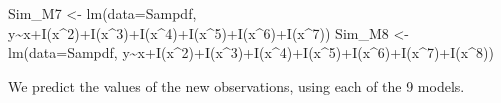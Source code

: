 \documentclass[
  letterpaper,
  DIV=11,
  numbers=noendperiod]{scrreprt}
\newenvironment{Shaded}{\begin{snugshade}}{\end{snugshade}}
\newcommand{\AttributeTok}[1]{\textcolor[rgb]{0.40,0.45,0.13}{#1}}
\newcommand{\DecValTok}[1]{\textcolor[rgb]{0.68,0.00,0.00}{#1}}
\newcommand{\FunctionTok}[1]{\textcolor[rgb]{0.28,0.35,0.67}{#1}}
\newcommand{\NormalTok}[1]{\textcolor[rgb]{0.00,0.23,0.31}{#1}}
\newcommand{\OtherTok}[1]{\textcolor[rgb]{0.00,0.23,0.31}{#1}}
\newcommand{\SpecialCharTok}[1]{\textcolor[rgb]{0.37,0.37,0.37}{#1}}
\begin{document}
\begin{Shaded}
\begin{Highlighting}[]
\NormalTok{Sim\_M7 }\OtherTok{\textless{}{-}} \FunctionTok{lm}\NormalTok{(}\AttributeTok{data=}\NormalTok{Sampdf, y}\SpecialCharTok{\textasciitilde{}}\NormalTok{x}\SpecialCharTok{+}\FunctionTok{I}\NormalTok{(x}\SpecialCharTok{\^{}}\DecValTok{2}\NormalTok{)}\SpecialCharTok{+}\FunctionTok{I}\NormalTok{(x}\SpecialCharTok{\^{}}\DecValTok{3}\NormalTok{)}\SpecialCharTok{+}\FunctionTok{I}\NormalTok{(x}\SpecialCharTok{\^{}}\DecValTok{4}\NormalTok{)}\SpecialCharTok{+}\FunctionTok{I}\NormalTok{(x}\SpecialCharTok{\^{}}\DecValTok{5}\NormalTok{)}\SpecialCharTok{+}\FunctionTok{I}\NormalTok{(x}\SpecialCharTok{\^{}}\DecValTok{6}\NormalTok{)}\SpecialCharTok{+}\FunctionTok{I}\NormalTok{(x}\SpecialCharTok{\^{}}\DecValTok{7}\NormalTok{))}
\NormalTok{Sim\_M8 }\OtherTok{\textless{}{-}} \FunctionTok{lm}\NormalTok{(}\AttributeTok{data=}\NormalTok{Sampdf, y}\SpecialCharTok{\textasciitilde{}}\NormalTok{x}\SpecialCharTok{+}\FunctionTok{I}\NormalTok{(x}\SpecialCharTok{\^{}}\DecValTok{2}\NormalTok{)}\SpecialCharTok{+}\FunctionTok{I}\NormalTok{(x}\SpecialCharTok{\^{}}\DecValTok{3}\NormalTok{)}\SpecialCharTok{+}\FunctionTok{I}\NormalTok{(x}\SpecialCharTok{\^{}}\DecValTok{4}\NormalTok{)}\SpecialCharTok{+}\FunctionTok{I}\NormalTok{(x}\SpecialCharTok{\^{}}\DecValTok{5}\NormalTok{)}\SpecialCharTok{+}\FunctionTok{I}\NormalTok{(x}\SpecialCharTok{\^{}}\DecValTok{6}\NormalTok{)}\SpecialCharTok{+}\FunctionTok{I}\NormalTok{(x}\SpecialCharTok{\^{}}\DecValTok{7}\NormalTok{)}\SpecialCharTok{+}\FunctionTok{I}\NormalTok{(x}\SpecialCharTok{\^{}}\DecValTok{8}\NormalTok{))}
\end{Highlighting}
\end{Shaded}

We predict the values of the new observations, using each of the 9
models.
\end{document}
